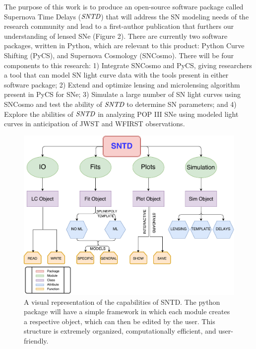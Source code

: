 The purpose of this work is to produce an open-source software package called Supernova Time Delays ($\textit{SNTD}$) that will address the SN modeling needs of the research community and lead to a first-author publication that furthers our understanding of lensed SNe (Figure 2). There are currently two software packages, written in Python, which are relevant to this product: Python Curve Shifting (PyCS), and Supernova Cosmology (SNCosmo). There will be four components to this research: 1) Integrate SNCosmo and PyCS, giving researchers a tool that can model SN light curve data with the tools present in either software package; 2) Extend and optimize lensing and microlensing algorithm present in PyCS for SNe; 3) Simulate a large number of SN light curves using SNCosmo and test the ability of $\textit{SNTD}$ to determine SN parameters; and 4) Explore the abilities of $\textit{SNTD}$ in analyzing POP III SNe using modeled light curves in anticipation of JWST and WFIRST observations. 
\begin{figure}[h]
\centering
\includegraphics[scale=.35]{gra_2017_Flow2.pdf}
\caption{A visual representation of the capabilities of SNTD. The python package will have a simple framework in which each module creates a respective object, which can then be edited by the user. This structure is extremely organized, computationally efficient, and user-friendly.}
\end{figure}

